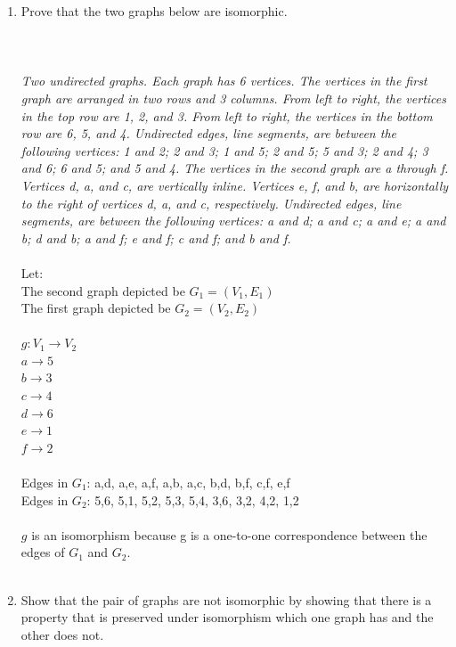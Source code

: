 \documentclass{amsart}
\theoremstyle{definition}
\theoremstyle{Exercise}
\theoremstyle{remark}
\theoremstyle{rule}
\numberwithin{equation}{section}
\begin{document}
\begin{enumerate}[label=(\alph*)]
\item Prove that the two graphs below are isomorphic.\\\\
   \\\\
 {\color{blue}{\bf Figure 4:} \emph{Two undirected graphs. Each graph has 6 vertices. The vertices in the first graph are arranged in two rows and 3 columns. From left to right, the vertices in the top row are 1, 2, and 3. From left to right, the vertices in the bottom row are 6, 5, and 4. Undirected edges, line segments, are between the following vertices: 1 and 2; 2 and 3; 1 and 5; 2 and 5; 5 and 3; 2 and 4; 3 and 6; 6 and 5; and 5 and 4. The vertices in the second graph are a through f. Vertices d, a, and c, are vertically inline. Vertices e, f, and b, are horizontally to the right of vertices d, a, and c, respectively. Undirected edges, line segments, are between the following vertices: a and d; a and c; a and e; a and b; d and b; a and f; e and f; c and f; and b and f.
}
}
\\\\
Let:\\
The second graph depicted be $G_1 = (V_1, E_1)$\\
The first graph depicted be $G_2 = (V_2, E_2)$\\\\

$g: V_1 \rightarrow V_2$\\
$a \rightarrow 5$\\
$b \rightarrow 3$\\
$c \rightarrow 4$\\
$d \rightarrow 6$\\
$e \rightarrow 1$\\
$f \rightarrow 2$\\\\

Edges in $G_1$: {a,d}, {a,e}, {a,f}, {a,b}, {a,c}, {b,d}, {b,f}, {c,f}, {e,f}\\
Edges in $G_2$: {5,6}, {5,1}, {5,2}, {5,3}, {5,4}, {3,6}, {3,2}, {4,2}, {1,2}\\\\

$g$ is an isomorphism because g is a one-to-one correspondence between the edges of $G_1$ and $G_2$.
\\\\
\item Show that the pair of graphs are not isomorphic by showing that there is a property that is preserved under isomorphism which one graph has and the other does not.\\


\end{enumerate}
\end{document}
